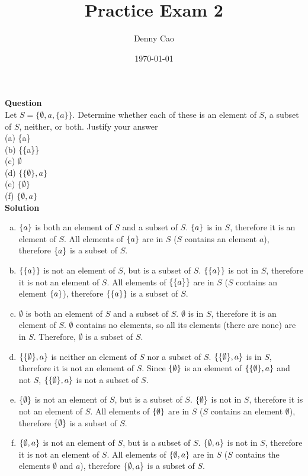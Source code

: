 \documentclass[article,12pt]{article}
\title{Practice Exam 2}
\author{Denny Cao}
\date{%
    \today
}
\newcounter{question}
\def\questionnum{{\Large\bfseries{Question \arabic{question} }}\\[1em]}
\newcommand{\question}{
    \stepcounter{question}
    \questionnum
}
\newcommand{\solution}{
    {{\large\bfseries{Solution}}}
}
\DeclarePairedDelimiter\set{\{}{\}}
\begin{document}
\maketitle
\question
Let $S = \{\emptyset ,a,\{a\}\}$. Determine whether each of these is an  element of $S$, a subset of $S$, neither, or both. Justify your answer\\(a) \{a\}\\(b) \{\{a\}\} \\(c) $\emptyset$\\(d) $\{\{\emptyset\}, a\}$\\(e) $\{\emptyset\}$\\(f) $\{\emptyset,a\}$ \\

\solution
\begin{enumerate}[(a)]
    \item $\set*{a}$ is both an element of $S$ and a subset of $S$. $\set*{a}$ is in $S$, therefore it is an element of $S$. All elements of $\set*{a}$ are in $S$ ($S$ contains an element $a$), therefore $\set*{a}$ is a subset of $S$. 
    \item $\set*{\set*{a}}$ is not an element of $S$, but is a subset of $S$. $\set*{\set*{a}}$ is not in $S$, therefore it is not an element of $S$. All elements of $\set*{\set*{a}}$ are in $S$ ($S$ contains an element $\set*{a}$), therefore $\set*{\set*{a}}$ is a subset of $S$.
    \item $\emptyset$ is both an element of $S$ and a subset of $S$. $\emptyset$ is in $S$, therefore it is an element of $S$. $\emptyset$ contains no elements, so all its elements (there are none) are in $S$. Therefore, $\emptyset$ is a subset of $S$.
    \item $\set*{\set*{\emptyset}, a}$ is neither an element of $S$ nor a subset of $S$. $\set*{\set*{\emptyset}, a}$ is in $S$, therefore it is not an element of $S$. Since $\set*{\emptyset}$ is an element of $\set*{\set*{\emptyset}, a}$ and not $S$, $\set*{\set*{\emptyset}, a}$ is not a subset of $S$.
    \item $\set*{\emptyset}$ is not an element of $S$, but is a subset of $S$. $\set*{\emptyset}$ is not in $S$, therefore it is not an element of $S$. All elements of $\set*{\emptyset}$ are in $S$ ($S$ contains an element $\emptyset$), therefore $\set*{\emptyset}$ is a subset of $S$.
    \item $\set*{\emptyset, a}$ is not an element of $S$, but is a subset of $S$. $\set*{\emptyset, a}$ is not in $S$, therefore it is not an element of $S$. All elements of $\set*{\emptyset, a}$ are in $S$ ($S$ contains the elements $\emptyset$ and $a$), therefore $\set*{\emptyset, a}$ is a subset of $S$.
\end{enumerate}
\newpage
\end{document}
